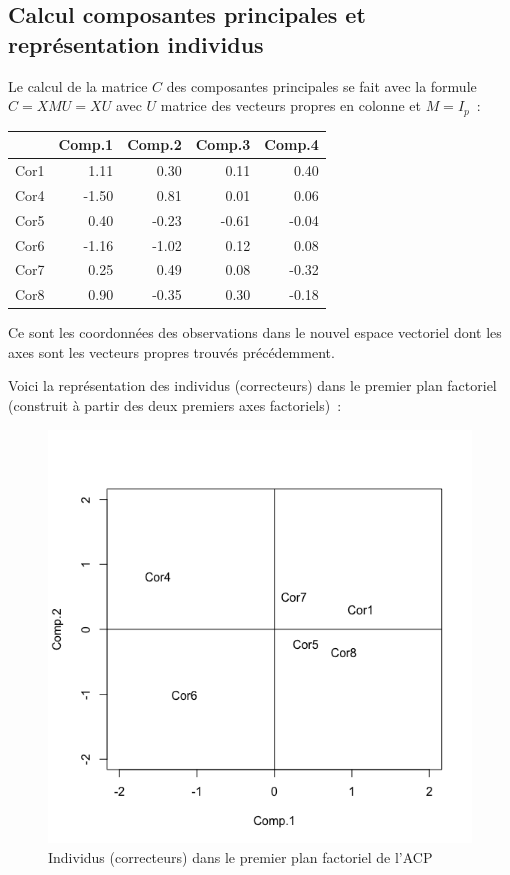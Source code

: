 \documentclass[a4paper,11pt]{report}
\begin{document}
\subsection{Calcul composantes principales et représentation individus}

Le calcul de la matrice $C$ des composantes principales se fait avec la formule $C = XMU = XU$ avec $U$ matrice des vecteurs propres en colonne et $M = I_p$~:

\begin{table}[H]
	\centering
	\begin{tabular}{r|rrrr}
		& Comp.1 & Comp.2 & Comp.3 & Comp.4 \\ 
		\hline
		Cor1 & 1.11 & 0.30 & 0.11 & 0.40 \\ 
		Cor4 & -1.50 & 0.81 & 0.01 & 0.06 \\ 
		Cor5 & 0.40 & -0.23 & -0.61 & -0.04 \\ 
		Cor6 & -1.16 & -1.02 & 0.12 & 0.08 \\ 
		Cor7 & 0.25 & 0.49 & 0.08 & -0.32 \\ 
		Cor8 & 0.90 & -0.35 & 0.30 & -0.18 \\ 
	\end{tabular}
\end{table}

Ce sont les coordonnées des observations dans le nouvel espace vectoriel dont les axes sont les vecteurs propres trouvés précédemment.

Voici la représentation des individus (correcteurs) dans le premier plan factoriel (construit à partir des deux premiers axes factoriels)~:

\begin{figure}[H]
	\centering
	\captionsetup{justification=centering, margin=2cm}
	\includegraphics[width=.5\linewidth]{img/2-1-2-individus-premier-plan-factoriel}
	\caption{\scriptsize Individus (correcteurs) dans le premier plan factoriel de l'ACP}
	\label{fig:individus_premier_plan_factoriel}
\end{figure}
\end{document}
